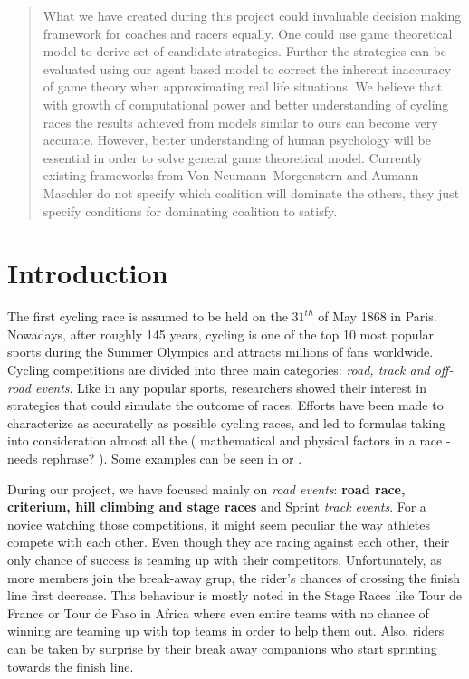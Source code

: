 \documentclass[10pt, a4paper]{report}
\begin{document}
\begin{abstract}
What we have created during this project could invaluable decision making framework for coaches and racers equally. One could use game theoretical model to derive set of candidate strategies. Further the strategies can be evaluated using our agent based model to correct the inherent inaccuracy of game theory when approximating real life situations. We believe that with growth of computational power and better understanding of cycling races the results achieved from models similar to ours can become very accurate. However, better understanding of human psychology will be essential in order to solve general game theoretical model. Currently existing frameworks from Von Neumann–Morgenstern and Aumann-Maschler do not specify which coalition will dominate the others, they just specify conditions for dominating coalition to satisfy.

\end{abstract}


\chapter{Introduction}\label{ch:intro}

The first cycling race is assumed to be held on the $31^{th}$ of May 1868 in Paris. Nowadays, after roughly 145 years, cycling is one of the top 10 most popular sports during the Summer Olympics \cite{TopEndSportsUrl} and attracts millions of fans worldwide. Cycling competitions are divided into three main categories: \textit{road, track and off-road events}. Like in any popular sports, researchers showed their interest in strategies that could simulate the outcome of races. Efforts have been made to characterize as accuratelly as possible cycling races, and led to formulas taking into consideration almost all the ( mathematical and physical factors in a race - needs rephrase? ). Some examples can be seen in \cite{AgentModel} or \cite{SlipStream} .

During our project, we have focused mainly on \textit{road events}: \textbf{road race, criterium, hill climbing and stage races} and Sprint \textit{track events}. For a novice watching those competitions, it might seem peculiar the way athletes compete with each other. Even though they are racing against each other, their only chance of success is teaming up with their competitors. Unfortunately, as more members join the break-away grup, the rider's chances of crossing the finish line first decrease. This behaviour is mostly noted in the Stage Races like Tour de France or Tour de Faso in Africa where even entire teams with no chance of winning are teaming up with top teams in order to help them out. Also, riders can be taken by surprise by their break away companions who start sprinting towards the finish line.
\end{document}
